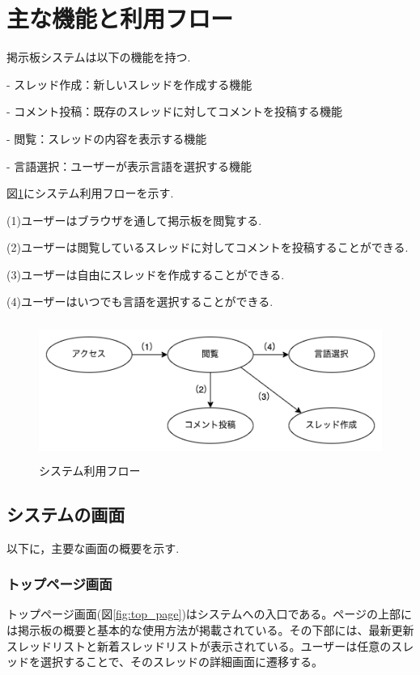 \documentclass[b5paper,12pt,dvipdfmx]{jsreport}
\begin{document}
\section{主な機能と利用フロー}

掲示板システムは以下の機能を持つ.

- スレッド作成：新しいスレッドを作成する機能

- コメント投稿：既存のスレッドに対してコメントを投稿する機能

- 閲覧：スレッドの内容を表示する機能

- 言語選択：ユーザーが表示言語を選択する機能

\newpage

図\ref{system_usage_flow}にシステム利用フローを示す.

(1)ユーザーはブラウザを通して掲示板を閲覧する.

(2)ユーザーは閲覧しているスレッドに対してコメントを投稿することができる.

(3)ユーザーは自由にスレッドを作成することができる.

(4)ユーザーはいつでも言語を選択することができる.

\begin{figure}[H]
	\centering
	\includegraphics[width=124mm,height=45mm]{img/system_usage_flow.png}
	\caption{システム利用フロー}
    \label{system_usage_flow}
\end{figure}


\subsection{システムの画面}

以下に，主要な画面の概要を示す.


\subsubsection{トップページ画面}
トップページ画面(図\ref{fig:top_page})はシステムへの入口である。ページの上部には掲示板の概要と基本的な使用方法が掲載されている。その下部には、最新更新スレッドリストと新着スレッドリストが表示されている。ユーザーは任意のスレッドを選択することで、そのスレッドの詳細画面に遷移する。
\end{document}
